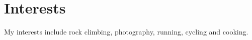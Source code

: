 \documentclass[11pt,a4paper,sans]{moderncv}
\begin{document}
\section{Interests}
My interests include rock climbing, photography, running, cycling and cooking.
\end{document}
